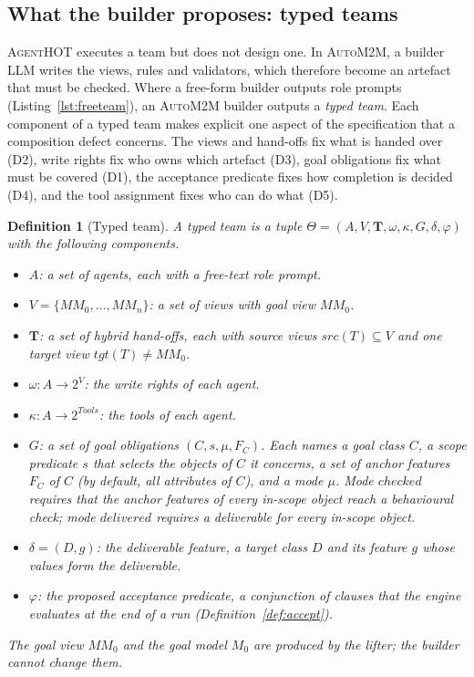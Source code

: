 \documentclass[pdflatex,sn-mathphys-num]{sn-jnl}
\theoremstyle{thmstyleone}%
\theoremstyle{thmstyletwo}%
\theoremstyle{thmstylethree}%
\newtheorem{definition}{Definition}%
\newcommand{\tool}{\textsc{AgentHOT}}
\newcommand{\auto}{\textsc{AutoM2M}}
\newcommand{\Team}{\Theta}
\newcommand{\D}[1]{\textsf{D#1}}
\newcommand{\MM}{\mathit{MM}}
\begin{document}
\subsection{What the builder proposes: typed teams}\label{sec:app-typed}

\tool{} executes a team but does not design one. In \auto{}, a builder LLM
writes the views, rules and validators, which therefore become an artefact that
must be checked. Where a free-form builder outputs role prompts
(Listing~\ref{lst:freeteam}), an \auto{} builder outputs a \emph{typed team}.
Each component of a typed team makes explicit one aspect of the specification
that a composition defect concerns. The views and hand-offs fix
what is handed over (\D{2}), write rights fix who owns which artefact (\D{3}),
goal obligations fix what must be covered (\D{1}), the acceptance predicate
fixes how completion is decided (\D{4}), and the tool assignment fixes who can
do what (\D{5}).

\begin{definition}[Typed team]\label{def:typed}
A typed team is a tuple $\Team=(A,V,\mathbf{T},\omega,\kappa,G,\delta,\varphi)$
with the following components.
\begin{itemize}[leftmargin=1.3em, itemsep=1pt, topsep=2pt]
\item $A$: a set of agents, each with a free-text role prompt.
\item $V=\{\MM_0,\dots,\MM_n\}$: a set of views with goal view $\MM_0$.
\item $\mathbf{T}$: a set of hybrid hand-offs, each with source views
$\mathit{src}(T)\subseteq V$ and one target view $\mathit{tgt}(T)\neq\MM_0$.
\item $\omega:A\to2^V$: the \emph{write rights} of each agent.
\item $\kappa:A\to2^{\mathit{Tools}}$: the tools of each agent.
\item $G$: a set of \emph{goal obligations} $(C,s,\mu,F_C)$. Each names a goal
class $C$, a \emph{scope} predicate $s$ that selects the objects of $C$ it
concerns, a set of \emph{anchor features} $F_C$ of $C$ (by default, all
attributes of $C$), and a mode $\mu$. Mode $\mathit{checked}$ requires that the
anchor features of every in-scope object reach a behavioural check; mode
$\mathit{delivered}$ requires a deliverable for every in-scope object.
\item $\delta=(D,g)$: the \emph{deliverable feature}, a target class $D$ and
its feature $g$ whose values form the deliverable.
\item $\varphi$: the proposed \emph{acceptance predicate}, a conjunction of
clauses that the engine evaluates at the end of a run
(Definition~\ref{def:accept}).
\end{itemize}
The goal view $\MM_0$ and the goal model $M_0$ are produced by the lifter; the
builder cannot change them.
\end{definition}
\end{document}
